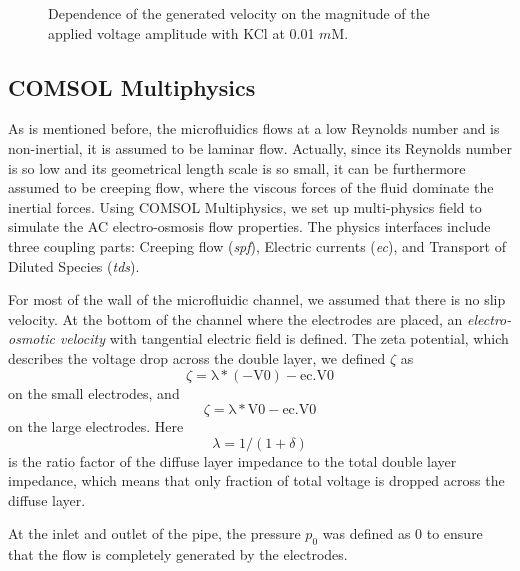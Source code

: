 \documentclass[journal,svgnames,twocolumn,x11names]{IEEEtran}
\begin{document}
\begin{figure}[htbp]
    \centering
    
    \caption{Dependence of the generated velocity on the magnitude of the applied voltage amplitude with KCl at 0.01 $m$M.}
    \label{fig:potential}
\end{figure}

\subsection{COMSOL Multiphysics}
As is mentioned before, the microfluidics flows at a low Reynolds number and is non-inertial, it is assumed to be laminar flow. Actually, since its Reynolds number is so low and its geometrical length scale is so small, it can be furthermore assumed to be creeping flow, where the viscous forces of the fluid dominate the inertial forces. Using COMSOL Multiphysics, we set up multi-physics field to simulate the AC electro-osmosis flow properties. The physics interfaces include three coupling parts: Creeping flow (\textit{spf}), Electric currents (\textit{ec}), and Transport of Diluted Species (\textit{tds}).

For most of the wall of the microfluidic channel, we assumed that there is no slip velocity. At the bottom of the channel where the electrodes are placed, an \emph{electro-osmotic velocity} with tangential electric field is defined. The zeta potential, which describes the voltage drop across the double layer, we defined $\zeta$ as
\begin{equation}
    \zeta=\mathrm{\lambda*(-V0)-ec.V0}
\end{equation}
on the small electrodes, and
\begin{equation}
    \zeta=\mathrm{\lambda*V0-ec.V0}
\end{equation}
on the large electrodes\cite{ramos2003}. Here
\begin{equation}
    \lambda=1 /(1+\delta)
\end{equation}
is the ratio factor of the diffuse layer impedance to the total double layer impedance, which means that only fraction of total voltage is dropped across the diffuse layer.

At the inlet and outlet of the pipe, the pressure $p_0$ was defined as 0 to ensure that the flow is completely generated by the electrodes.
\end{document}
